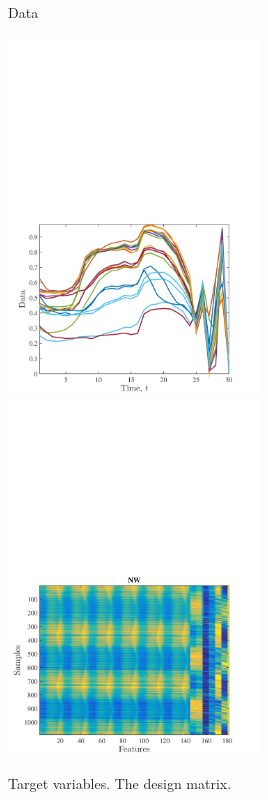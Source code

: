 \documentclass{beamer}
\begin{document}
\begin{frame}{Data}

\includegraphics[trim= 2cm 0 0 15cm,clip,width=0.5\textwidth]{fig/feature_selection/EnergyWeather/data_segms_orig_test.png}
\includegraphics[trim= 2cm 0 0 15cm,clip,width=0.5\textwidth]{fig/feature_selection/EnergyWeather/generation_orig_test_fs_NW.png}

\quad Target variables. \hspace{3cm} The design matrix.

\end{frame}
\end{document}
